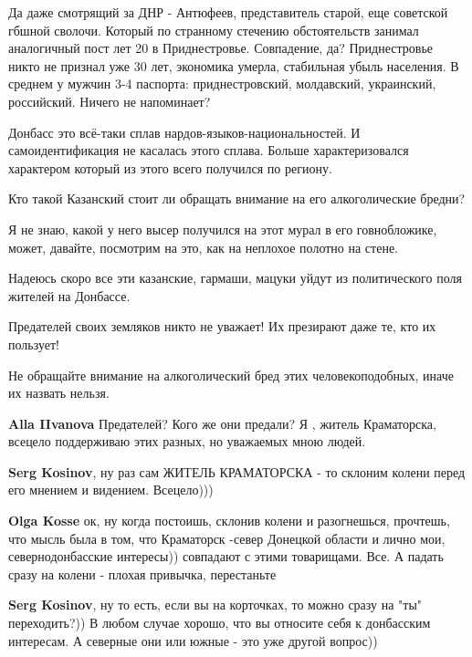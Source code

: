 \begin{itemize}
\begin{itemize}
Да даже смотрящий за ДНР - Антюфеев, представитель старой, еще советской гбшной
сволочи. Который по странному стечению обстоятельств занимал аналогичный пост
лет 20 в Приднестровье. Совпадение, да? Приднестровье никто не признал уже 30
лет, экономика умерла, стабильная убыль населения. В среднем у мужчин 3-4
паспорта: приднестровский, молдавский, украинский, российский. Ничего не
напоминает?


\end{itemize} %


Донбасс это всё-таки сплав нардов-языков-национальностей. И самоидентификация не
касалась этого сплава. Больше характеризовался характером который из этого всего
получился по региону.



Кто такой Казанский стоит ли обращать внимание на его алкоголические бредни?

Я не знаю, какой у него высер получился на этот мурал в его говнобложике,
может, давайте, посмотрим на это, как на неплохое полотно на стене.

Надеюсь скоро все эти казанские, гармаши, мацуки уйдут из политического поля
жителей на Донбассе.

Предателей своих земляков никто не уважает! Их презирают даже те, кто их
пользует!

Не обращайте внимание на алкоголический бред этих человекоподобных, иначе их
назвать нельзя.

\begin{itemize} %
\textbf{Alla IIvanova} Предателей? Кого же они предали? Я , житель Краматорска, всецело поддерживаю этих разных, но уважаемых мною людей.

\textbf{Serg Kosinov}, ну раз сам ЖИТЕЛЬ КРАМАТОРСКА - то склоним колени перед его мнением и видением. Всецело)))

\textbf{Olga Kosse} ок, ну когда постоишь, склонив колени и разогнешься, прочтешь, что мысль была в том, что Краматорск -север Донецкой области и лично мои, севернодонбасские интересы)) совпадают с этими товарищами. Все. А падать сразу на колени - плохая привычка, перестаньте

\textbf{Serg Kosinov}, ну то есть, если вы на корточках, то можно сразу на "ты" переходить?)) В любом случае хорошо, что вы относите себя к донбасским интересам. А северные они или южные - это уже другой вопрос))


\end{itemize}
\end{itemize}
